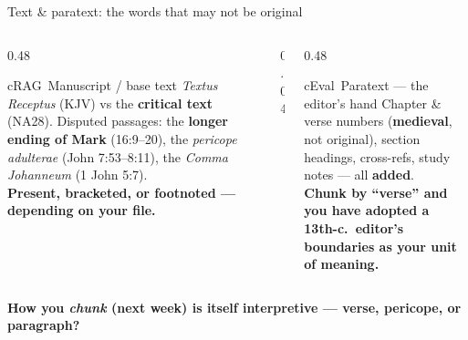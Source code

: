 \begin{frame}{Text \& paratext: the words that may not be original}
  \begin{columns}[t, totalwidth=\textwidth]
    \begin{column}{0.48\textwidth}
      \begin{featbox}{cRAG}{\faScroll\ Manuscript / base text}
        \scriptsize
        \emph{Textus Receptus} (KJV) vs the \textbf{critical text} (NA28). Disputed
        passages: the \textbf{longer ending of Mark} (16:9--20), the \emph{pericope
        adulterae} (John 7:53--8:11), the \emph{Comma Johanneum} (1 John 5:7).
        \\[3pt]\textbf{Present, bracketed, or footnoted --- depending on your file.}
      \end{featbox}
    \end{column}
    \begin{column}{0.04\textwidth}\end{column}
    \begin{column}{0.48\textwidth}
      \begin{featbox}{cEval}{\faStickyNote\ Paratext --- the editor's hand}
        \scriptsize
        Chapter \& verse numbers (\textbf{medieval}, not original), section headings,
        cross-refs, study notes --- all \textbf{added}.
        \\[3pt]\textbf{Chunk by ``verse'' and you have adopted a 13th-c.\ editor's
        boundaries as your unit of meaning.}
      \end{featbox}
    \end{column}
  \end{columns}
  \vspace{8pt}
  \begin{center}\small\color{labnavy}\bfseries
    How you \emph{chunk} (next week) is itself interpretive --- verse, pericope, or paragraph?\end{center}
\end{frame}

